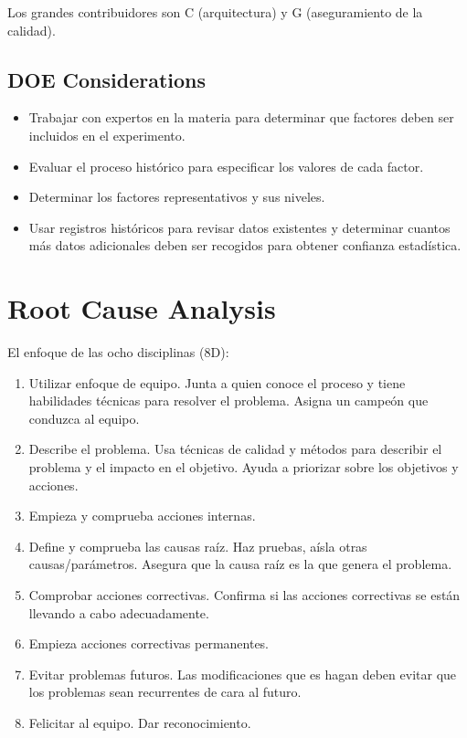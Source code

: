 \documentclass[oneside]{book}
\begin{document}
Los grandes contribuidores son C (arquitectura) y G (aseguramiento de la calidad).

\section{DOE Considerations}

\begin{itemize}
	\item Trabajar con expertos en la materia para determinar que factores deben ser incluidos en el experimento.
	\item Evaluar el proceso histórico para especificar los valores de cada factor.
	\item Determinar los factores representativos y sus niveles.
	\item Usar registros históricos para revisar datos existentes y determinar cuantos más datos adicionales deben ser recogidos para obtener confianza estadística.
\end{itemize}

\chapter{Root Cause Analysis}

El enfoque de las ocho disciplinas (8D): \begin{enumerate}
	\item Utilizar enfoque de equipo. Junta a quien conoce el proceso y tiene habilidades técnicas para resolver el problema. Asigna un campeón que conduzca al equipo.
	\item Describe el problema. Usa técnicas de calidad y métodos para describir el problema y el impacto en el objetivo. Ayuda a priorizar sobre los objetivos y acciones.
	\item Empieza y comprueba acciones internas. 
	\item Define y comprueba las causas raíz. Haz pruebas, aísla otras causas/parámetros. Asegura que la causa raíz es la que genera el problema.
	\item Comprobar acciones correctivas. Confirma si las acciones correctivas se están llevando a cabo adecuadamente.
	\item Empieza acciones correctivas permanentes. 
	\item Evitar problemas futuros. Las modificaciones que es hagan deben evitar que los problemas sean recurrentes de cara al futuro.
	\item Felicitar al equipo. Dar reconocimiento.
\end{enumerate}
\end{document}
